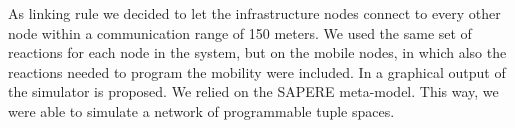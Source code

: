 \documentclass[12pt,a4paper,twoside,openright]{book}
\begin{document}
As linking rule we decided to let the infrastructure nodes connect to every other node within a communication range of 150 meters. 
%
We used the same set of reactions for each node in the system, but on the mobile nodes, in which also the reactions needed to program the mobility were included.
%
In  a graphical output of the simulator is proposed.
%
We relied on the SAPERE meta-model.
%
This way, we were able to simulate a network of programmable tuple spaces.

\begin{figure}
~
~
\end{figure}
\end{document}

